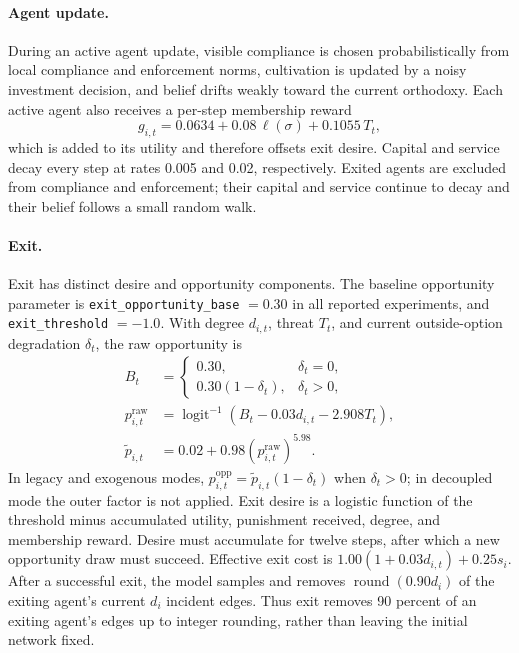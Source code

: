 \documentclass[12pt]{article}
\begin{document}
\paragraph{Agent update.} During an active agent update, visible compliance is
chosen probabilistically from local compliance and enforcement norms,
cultivation is updated by a noisy investment decision, and belief drifts weakly
toward the current orthodoxy. Each active agent also receives a per-step
membership reward
\begin{equation}
 g_{i,t}=0.0634+0.08\,\ell(\sigma)+0.1055\,T_t,
\end{equation}
which is added to its utility and therefore offsets exit desire. Capital and
service decay every step at rates 0.005 and 0.02, respectively. Exited agents are
excluded from compliance and enforcement; their capital and service continue to
decay and their belief follows a small random walk.

\paragraph{Exit.} Exit has distinct desire and opportunity components. The
baseline opportunity parameter is \texttt{exit\_opportunity\_base} \(=0.30\) in
all reported experiments, and \texttt{exit\_threshold} \(=-1.0\). With degree
\(d_{i,t}\), threat \(T_t\), and current outside-option degradation \(\delta_t\),
the raw opportunity is
\begin{align}
 B_t&=\begin{cases}0.30,&\delta_t=0,\\0.30(1-\delta_t),&\delta_t>0,\end{cases}\\
 p^{\mathrm{raw}}_{i,t}&=\operatorname{logit}^{-1}(B_t-0.03d_{i,t}-2.908T_t),\\
 \widetilde p_{i,t}&=0.02+0.98\left(p^{\mathrm{raw}}_{i,t}\right)^{5.98}.
\end{align}
In legacy and exogenous modes,
\(p^{\mathrm{opp}}_{i,t}=\widetilde p_{i,t}(1-\delta_t)\) when \(\delta_t>0\); in
decoupled mode the outer factor is not applied. Exit desire is a logistic
function of the threshold minus accumulated utility, punishment received,
degree, and membership reward. Desire must accumulate for twelve steps, after
which a new opportunity draw must succeed. Effective exit cost is
\(1.00(1+0.03d_{i,t})+0.25s_i\). After a successful exit, the model samples and
removes \(\operatorname{round}(0.90d_i)\) of the exiting agent's current \(d_i\)
incident edges. Thus exit removes 90 percent of an exiting agent's edges up to
integer rounding, rather than leaving the initial network fixed.
\end{document}
